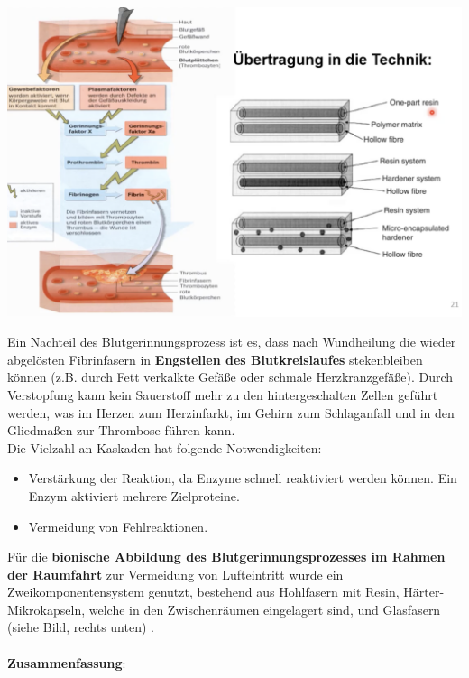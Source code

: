 \begin{center}
    \includegraphics[width=14cm]{lec5/figures/blutgerinnung.png}
\end{center}

Ein Nachteil des Blutgerinnungsprozess ist es, dass nach Wundheilung die wieder abgelösten Fibrinfasern in \textbf{Engstellen des Blutkreislaufes} stekenbleiben können (z.B. durch Fett verkalkte Gefäße oder schmale Herzkranzgefäße). Durch Verstopfung kann kein Sauerstoff mehr zu den hintergeschalten Zellen geführt werden, was im Herzen zum Herzinfarkt, im Gehirn zum Schlaganfall und in den Gliedmaßen zur Thrombose führen kann.\\

Die Vielzahl an Kaskaden hat folgende Notwendigkeiten:

\begin{itemize}
    \item Verstärkung der Reaktion, da Enzyme schnell reaktiviert werden können. Ein Enzym aktiviert mehrere Zielproteine.
    \item Vermeidung von Fehlreaktionen.
\end{itemize}

Für die \textbf{bionische Abbildung des Blutgerinnungsprozesses im Rahmen der Raumfahrt} zur Vermeidung von Lufteintritt wurde ein Zweikomponentensystem genutzt, bestehend aus Hohlfasern mit Resin, Härter-Mikrokapseln, welche in den Zwischenräumen eingelagert sind, und Glasfasern (siehe Bild, rechts unten) \dangersign.
\\\\
\textbf{Zusammenfassung}:

